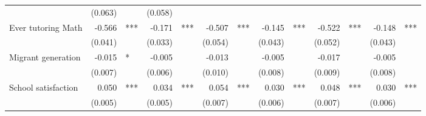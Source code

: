 \documentclass{article}
\begin{document}
\begin{table}[!h]
\begin{tabular}{lllllllllllll}
  \multicolumn{1}{l}{} &
  \multicolumn{1}{r}{(0.063)} &
  \multicolumn{1}{l}{} &
  \multicolumn{1}{r}{(0.058)} &
  \multicolumn{1}{l}{} \\
\multicolumn{1}{l}{Ever tutoring Math} &
  \multicolumn{1}{r}{-0.566} &
  \multicolumn{1}{l}{***} &
  \multicolumn{1}{r}{-0.171} &
  \multicolumn{1}{l}{***} &
  \multicolumn{1}{r}{-0.507} &
  \multicolumn{1}{l}{***} &
  \multicolumn{1}{r}{-0.145} &
  \multicolumn{1}{l}{***} &
  \multicolumn{1}{r}{-0.522} &
  \multicolumn{1}{l}{***} &
  \multicolumn{1}{r}{-0.148} &
  \multicolumn{1}{l}{***} \\
\multicolumn{1}{l}{} &
  \multicolumn{1}{r}{(0.041)} &
  \multicolumn{1}{l}{} &
  \multicolumn{1}{r}{(0.033)} &
  \multicolumn{1}{l}{} &
  \multicolumn{1}{r}{(0.054)} &
  \multicolumn{1}{l}{} &
  \multicolumn{1}{r}{(0.043)} &
  \multicolumn{1}{l}{} &
  \multicolumn{1}{r}{(0.052)} &
  \multicolumn{1}{l}{} &
  \multicolumn{1}{r}{(0.043)} &
  \multicolumn{1}{l}{} \\
\multicolumn{1}{l}{Migrant generation} &
  \multicolumn{1}{r}{-0.015} &
  \multicolumn{1}{l}{*} &
  \multicolumn{1}{r}{-0.005} &
  \multicolumn{1}{l}{} &
  \multicolumn{1}{r}{-0.013} &
  \multicolumn{1}{l}{} &
  \multicolumn{1}{r}{-0.005} &
  \multicolumn{1}{l}{} &
  \multicolumn{1}{r}{-0.017} &
  \multicolumn{1}{l}{} &
  \multicolumn{1}{r}{-0.005} &
  \multicolumn{1}{l}{} \\
\multicolumn{1}{l}{} &
  \multicolumn{1}{r}{(0.007)} &
  \multicolumn{1}{l}{} &
  \multicolumn{1}{r}{(0.006)} &
  \multicolumn{1}{l}{} &
  \multicolumn{1}{r}{(0.010)} &
  \multicolumn{1}{l}{} &
  \multicolumn{1}{r}{(0.008)} &
  \multicolumn{1}{l}{} &
  \multicolumn{1}{r}{(0.009)} &
  \multicolumn{1}{l}{} &
  \multicolumn{1}{r}{(0.008)} &
  \multicolumn{1}{l}{} \\
\multicolumn{1}{l}{School satisfaction} &
  \multicolumn{1}{r}{0.050} &
  \multicolumn{1}{l}{***} &
  \multicolumn{1}{r}{0.034} &
  \multicolumn{1}{l}{***} &
  \multicolumn{1}{r}{0.054} &
  \multicolumn{1}{l}{***} &
  \multicolumn{1}{r}{0.030} &
  \multicolumn{1}{l}{***} &
  \multicolumn{1}{r}{0.048} &
  \multicolumn{1}{l}{***} &
  \multicolumn{1}{r}{0.030} &
  \multicolumn{1}{l}{***} \\
\multicolumn{1}{l}{} &
  \multicolumn{1}{r}{(0.005)} &
  \multicolumn{1}{l}{} &
  \multicolumn{1}{r}{(0.005)} &
  \multicolumn{1}{l}{} &
  \multicolumn{1}{r}{(0.007)} &
  \multicolumn{1}{l}{} &
  \multicolumn{1}{r}{(0.006)} &
  \multicolumn{1}{l}{} &
  \multicolumn{1}{r}{(0.007)} &
  \multicolumn{1}{l}{} &
  \multicolumn{1}{r}{(0.006)} &

\end{tabular}
\end{table}
\end{document}
